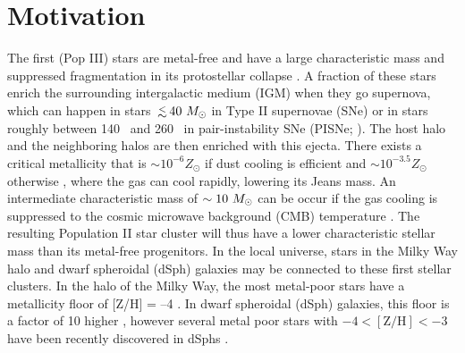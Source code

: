 \documentclass[12pt]{article}
\newcommand{\lsim}{\lower0.3em\hbox{$\,\buildrel <\over\sim\,$}}
\newcommand{\Ms}{\ifmmode{M_\odot}\else{$M_\odot$}\fi}
\begin{document}

\section*{Motivation}

The first (Pop III) stars are metal-free and have a large
characteristic mass and suppressed fragmentation in its protostellar
collapse \cite{Abel00, ABN02, Bromm02_P3, Yoshida03, OShea07a}.  A
fraction of these stars enrich the surrounding intergalactic medium
(IGM) when they go supernova, which can happen in stars $\lsim 40~\Ms$
in Type II supernovae (SNe) or in stars roughly between 140 \Ms~and
260 \Ms~in pair-instability SNe (PISNe; \cite{2002ApJ...567..532H}).
The host halo and the neighboring halos are then enriched with this
ejecta.  There exists a critical metallicity that is $\sim 10^{-6}
Z_\odot$ if dust cooling is efficient \cite{Omukai05,
  Schneider06_Frag, clark08} and $\sim 10^{-3.5} Z_\odot$ otherwise
\cite{Bromm01, 2009ApJ...691..441S}, where the gas can cool rapidly,
lowering its Jeans mass.  An intermediate characteristic mass of
$\sim10~\Ms$ can be occur if the gas cooling is suppressed to the
cosmic microwave background (CMB) temperature \cite{Larson98,
  Tumlinson07_IMF, 2009ApJ...691..441S}.  The resulting Population II
star cluster will thus have a lower characteristic stellar mass than
its metal-free progenitors.  In the local universe, stars in the Milky
Way halo and dwarf spheroidal (dSph) galaxies may be connected to
these first stellar clusters.  In the halo of the Milky Way, the most
metal-poor stars have a metallicity floor of [Z/H] = --4
\cite{Beers05}.  In dwarf spheroidal (dSph) galaxies, this floor is a
factor of 10 higher \cite{Tolstoy04, Helmi06}, however several metal
poor stars with $-4 < [\mathrm{Z/H}] < -3$ have been recently
discovered in dSphs \cite{Tafelmeyer10, Frebel10_Obs}.
\end{document}
